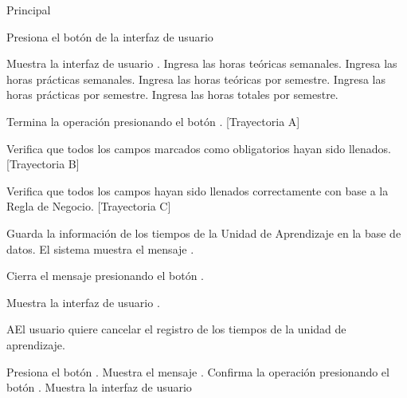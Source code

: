 \begin{UCtrayectoria}{Principal}

\UCpaso[\UCactor] Presiona el botón  de la interfaz de usuario 

\UCpaso Muestra la interfaz de usuario .
\UCpaso[\UCactor] Ingresa las horas teóricas semanales.
\UCpaso[\UCactor] Ingresa las horas prácticas semanales.
\UCpaso[\UCactor] Ingresa las horas teóricas por semestre.
\UCpaso[\UCactor] Ingresa las horas prácticas por semestre.
\UCpaso[\UCactor] Ingresa las horas totales por semestre.

\UCpaso[\UCactor] Termina la operación presionando el botón . [Trayectoria A]

\UCpaso Verifica que todos los campos marcados como obligatorios hayan sido llenados. [Trayectoria B]

\UCpaso Verifica que todos los campos hayan sido llenados correctamente con base a la Regla de Negocio. [Trayectoria C] %


\UCpaso Guarda la información de los tiempos de la Unidad de Aprendizaje en la base de datos.
\UCpaso El sistema muestra el mensaje .

\UCpaso[\UCactor] Cierra el mensaje presionando el botón .

\UCpaso Muestra la interfaz de usuario .
\end{UCtrayectoria}


\begin{UCtrayectoriaA}{A}{El usuario quiere cancelar el registro de los tiempos de la unidad de aprendizaje.}

\UCpaso[\UCactor] Presiona el botón .
\UCpaso Muestra el mensaje .
\UCpaso[\UCactor] Confirma la operación presionando el botón .
\UCpaso Muestra la interfaz de usuario 

\end{UCtrayectoriaA}


